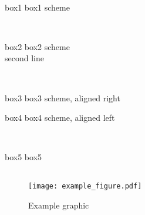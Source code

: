 \documentclass{beamer}
\begin{document}
\begin{frame}[t,fragile]
\begin{columns}[T,totalwidth=\textwidth]
\begin{column}{.48\textwidth}
\begin{columns}[T,totalwidth=\textwidth]
\begin{column}{.48\textwidth}
		\begin{center}~
			\begin{beamercolorbox}[wd=.7\textwidth,sep=4pt,center]{box1}
			box1 scheme
			\end{beamercolorbox}
		\end{center}
					
		\begin{center}~
			\begin{beamercolorbox}[wd=.7\textwidth,sep=4pt,center]{box2}	
			box2 scheme  \\
			second line
		\end{beamercolorbox}
		\end{center}
					
		\begin{center}~
			\begin{beamercolorbox}[wd=0.3\textwidth,sep=4pt,right]{box3}
			box3 scheme, aligned right
			\end{beamercolorbox}
			\hspace{11pt}
			
			\begin{beamercolorbox}[wd=0.3\textwidth,sep=4pt]{box4}		
			box4 scheme, aligned left
			\end{beamercolorbox}
		\end{center}
					
		\begin{center}~
			\begin{beamercolorbox}[wd=4cm,ht=5cm,sep=4pt,center]{box5}
			box5
			\end{beamercolorbox}
		\end{center}
		\end{column}
		
	\end{columns}	


			
		\begin{figure}
		\centering
		\texttt{[image: example\_figure.pdf]}
		\caption{Example graphic}

		\end{figure}		
	
	\end{column}
	
\end{columns}

\end{frame}
\end{document}
